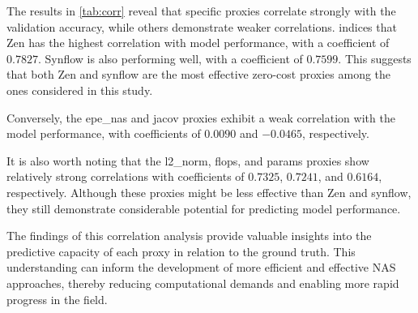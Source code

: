 The results in \cref{tab:corr} reveal that specific proxies correlate strongly with the validation accuracy, while others demonstrate weaker correlations.  indices that Zen has the highest correlation with model performance, with a coefficient of $0.7827$. Synflow is also performing well, with a coefficient of $0.7599$. This suggests that both Zen and synflow are the most effective zero-cost proxies among the ones considered in this study. 

Conversely, the epe\_nas and jacov proxies exhibit a weak correlation with the model performance, with coefficients of $0.0090$ and $-0.0465$, respectively. 

It is also worth noting that the l2\_norm, flops, and params proxies show relatively strong correlations with coefficients of $0.7325$, $0.7241$, and $0.6164$, respectively. Although these proxies might be less effective than Zen and synflow, they still demonstrate considerable potential for predicting model performance.

The findings of this correlation analysis provide valuable insights into the predictive capacity of each proxy in relation to the ground truth. This understanding can inform the development of more efficient and effective NAS approaches, thereby reducing computational demands and enabling more rapid progress in the field.
